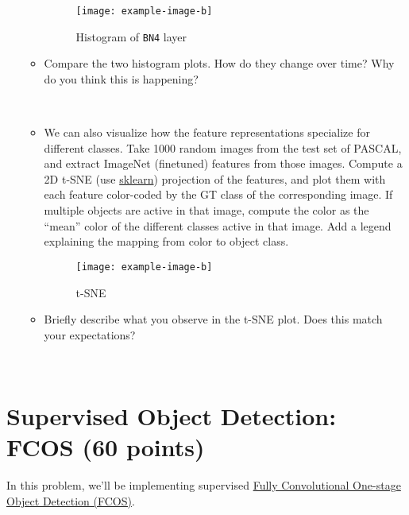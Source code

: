 \documentclass[11pt,addpoints,answers]{exam}
\numberwithin{equation}{section} %
\numberwithin{figure}{section} %
\numberwithin{table}{section} %
\begin{document}
\begin{itemize}
\begin{itemize}
        \begin{figure}[H]
        \centering
        \texttt{[image: example-image-b]}
        \caption{Histogram of \texttt{BN4} layer}
        \label{fig:q2_bn}
        \end{figure}

        \item Compare the two histogram plots. How do they change over time? Why do you think this is happening?

        \begin{solution}
        \\
        \end{solution}
        
        \item We can also visualize how the feature representations specialize for different classes. Take 1000 random images from the test set of PASCAL, and extract ImageNet (finetuned) features from those images. Compute a 2D t-SNE (use \href{https://scikit-learn.org/stable/modules/generated/sklearn.manifold.TSNE.html}{sklearn}) projection of the features, and plot them with each feature color-coded by the GT class of the corresponding image. If multiple objects are active in that image, compute the color as the ``mean” color of the different classes active in that image. Add a legend explaining the mapping from color to object class. 

        \begin{figure}[H]
        \centering
        \texttt{[image: example-image-b]}
        \caption{t-SNE}
        \label{fig:q2_tsne}
        \end{figure}

        \item Briefly describe what you observe in the t-SNE plot. Does this match your expectations?

        \begin{solution}
        \\
        \end{solution}
        
    \end{itemize}
\end{itemize}

\clearpage
\section{Supervised Object Detection: FCOS (60 points)}
In this problem, we'll be implementing supervised {\href{https://arxiv.org/abs/1904.01355}{Fully Convolutional One-stage Object Detection (FCOS)}}. 
\end{document}
